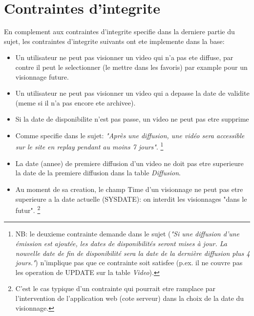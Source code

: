 \documentclass[twoside,openright,a4paper,11pt,french]{article}
\begin{document}
\newpage
\section{Contraintes d'integrite}
En complement aux contraintes d'integrite specifie dans la derniere partie du
sujet, les contraintes d'integrite suivants ont ete implemente dans la base:

\begin{itemize}
\item Un utilisateur ne peut pas visionner un video qui n'a pas ete diffuse,
par contre il peut le selectionner (le mettre dans les favoris) par example
pour un visionnage future.

\item Un utilisateur ne peut pas visionner un video qui a depasse la date de validite
(meme si il n'a pas encore ete archivee).

\item Si la date de disponibilite n'est pas passe, un video ne peut pas etre supprime

\item Comme specifie dans le sujet: {\it "Après une diffusion, une vidéo sera
accessible sur le site en replay pendant au moins 7 jours"}.
\footnote{NB: le deuxieme contrainte demande dans le sujet ({\it"Si une diffusion d’une émission est
ajoutée, les dates de disponibilités seront mises à jour.  La nouvelle date de
fin de disponibilité sera la date de la dernière diffusion plus 4 jours."}) n'implique
pas que ce contrainte soit satisfee (p.ex. il ne couvre pas les operation de UPDATE 
sur la table {\it Video}).}

\item La date (annee) de premiere diffusion d'un video ne doit pas
etre superieure la date de la premiere diffusion dans la table {\it Diffusion}.

\item Au moment de sa creation, le champ Time d'un visionnage ne peut pas etre superieure
a la date actuelle (SYSDATE): on interdit les visionnages "dans le futur".
\footnote{C'est le cas typique d'un contrainte qui pourrait etre ramplace par l'intervention de
l'application web (cote serveur) dans la choix de la date du visionnage.}

\end{itemize}

\end{document}
